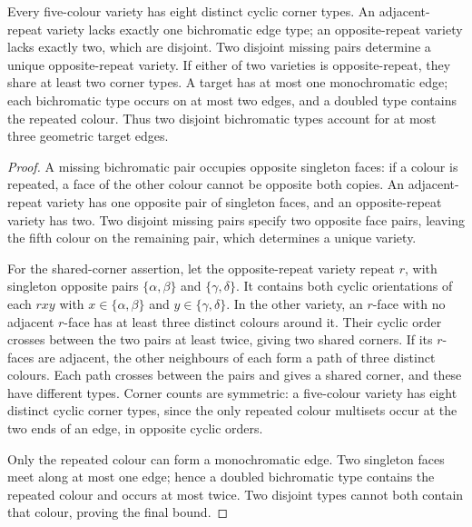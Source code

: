 \begin{lemma}\label{lem:cube-incidence}
Every five-colour variety has eight distinct cyclic corner types.
An adjacent-repeat variety lacks exactly one bichromatic edge type;
an opposite-repeat variety lacks exactly two, which are disjoint.
Two disjoint missing pairs determine a unique opposite-repeat variety.
If either of two varieties is opposite-repeat, they share at least two
corner types. A target has at most one monochromatic edge; each bichromatic
type occurs on at most two edges, and a doubled type contains the repeated
colour. Thus two disjoint bichromatic types account for at most three
geometric target edges.
\end{lemma}
\begin{proof}
A missing bichromatic pair occupies opposite singleton faces: if a colour
is repeated, a face of the other colour cannot be opposite both copies.
An adjacent-repeat variety has one opposite pair of singleton faces, and an
opposite-repeat variety has two. Two disjoint missing pairs specify two
opposite face pairs, leaving the fifth colour on the remaining pair,
which determines a unique variety.

For the shared-corner assertion, let the opposite-repeat variety repeat
$r$, with singleton opposite pairs $\{\alpha,\beta\}$ and
$\{\gamma,\delta\}$. It contains both cyclic orientations of each
$rxy$ with $x\in\{\alpha,\beta\}$ and $y\in\{\gamma,\delta\}$.
In the other variety, an $r$-face with no adjacent $r$-face has at least
three distinct colours around it. Their cyclic order crosses between the
two pairs at least twice, giving two shared corners. If its $r$-faces
are adjacent, the other neighbours of each form a path of three distinct
colours. Each path crosses between the pairs and gives a shared corner,
and these have different types. Corner counts are symmetric: a five-colour
variety has eight distinct cyclic corner types, since the only repeated
colour multisets occur at the two ends of an edge, in opposite cyclic orders.

Only the repeated colour can form a monochromatic edge. Two singleton
faces meet along at most one edge; hence a doubled bichromatic type
contains the repeated colour and occurs at most twice. Two disjoint types
cannot both contain that colour, proving the final bound.
\end{proof}

